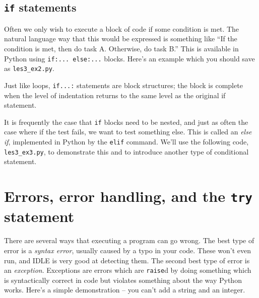 \documentclass[m3380-lec-main.tex]{subfiles}
\begin{document}
\smallskip\noindent

\subsection{\texttt{if} statements} Often we only wish to execute a block of code if some condition is met. The natural language way that this would be expressed is something like ``If the condition is met, then do task A. Otherwise, do task B.'' This is available in Python using \verb|if:... else:...| blocks. Here's an example which you should save as \verb|les3_ex2.py|.

\smallskip\noindent
Just like loops, \verb|if...:| statements are block structures; the block is complete when the level of indentation returns to the same level as the original if statement.

It is frequently the case that \verb|if| blocks need to be nested, and just as often the case where if the test fails, we want to test something else. This is called an \emph{else if}, implemented in Python by the \verb|elif| command. We'll use the following code, \verb|les3_ex3.py|, to demonstrate this and to introduce another type of conditional statement.

\smallskip\noindent

\section{Errors, error handling, and the \texttt{try} statement}
There are several ways that executing a program can go wrong. The best type of error is a \emph{syntax error}, usually caused by a typo in your code. These won't even run, and IDLE is very good at detecting them. The second best type of error is an \emph{exception}. Exceptions are errors which are \verb|raise|d by doing something which is syntactically correct in code but violates something about the way Python works. Here's a simple demonstration -- you can't add a string and an integer.
\end{document}
